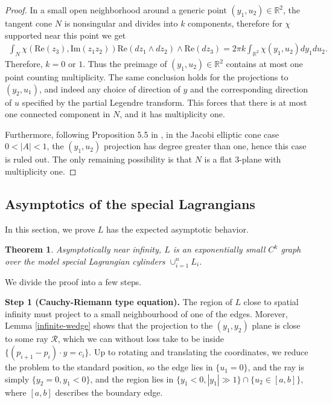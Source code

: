 \documentclass[11pt]{article}
\newtheorem{theorem}{Theorem}
\begin{document}
\begin{proof}
In a small open neighborhood around a generic point $(y_1, u_2) \in \mathbb{R}^2$, the tangent cone $N$ is nonsingular and divides into $k$ components, therefore for $\chi$ supported near this point we get 
\begin{align*}
    \int_N \chi (\text{Re}(z_3), \text{Im}(z_1 z_2)) \text{Re}(dz_1 \wedge dz_2) \wedge \text{Re}(dz_3) = 2 \pi k \int_{\mathbb{R}^2} \chi(y_1,u_2) dy_1 du_2.
\end{align*}
Therefore, $k = 0$ or $1$. Thus the preimage of $(y_1, u_2)\in \mathbb{R}^2$ contains at most one point counting multiplicity. The same conclusion holds for the projections to $(y_2, u_1)$, and indeed any choice of direction of $y$ and the corresponding direction of $u$ specified by the partial Legendre transform. 
This forces that
there is at most one connected component in $N$, and it has multiplicity one.



Furthermore, following Proposition 5.5 in \cite{MR2122282}, in the Jacobi elliptic cone case $0<|A|<1$, the $(y_1,u_2)$ projection has degree greater than one, hence this case is ruled out. The only remaining possibility is that $N$ is a flat 3-plane with multiplicity one. 
\vspace{10pt}
\end{proof}




\subsection{Asymptotics of the special Lagrangians}\label{Asymptotic-behavior}

In this section, we prove $L$ has the expected asymptotic behavior. 

\begin{theorem}
Asymptotically near infinity, 
    $L$ is an exponentially small $C^k$ graph over the model special Lagrangian cylinders $\cup_{i=1}^n L_i$.
\end{theorem}







We divide the proof into a few steps.



\textbf{Step 1 (Cauchy-Riemann type equation).} The region of $L$ close to spatial infinity must project to a small neighbourhood of one of the edges. Morever, Lemma \ref{infinite-wedge} shows that the projection to the $(y_1,y_2)$ plane is close to some ray $\mathcal{R}$, which we can without loss take to be inside $\{ (p_{i+1}- p_i)\cdot y=c_i  \}$. Up to rotating and translating the coordinates, we reduce the problem to the standard position, so the edge lies in $\{ u_1=0 \}$, and the ray is simply $\{ y_2=0 , y_1<0  \}$, and the region lies in  $\{ y_1<0, |y_1|\gg 1\}\cap \{ u_2\in [a,b]\} $, where $[a,b]$ describes the boundary edge. 
\end{document}
